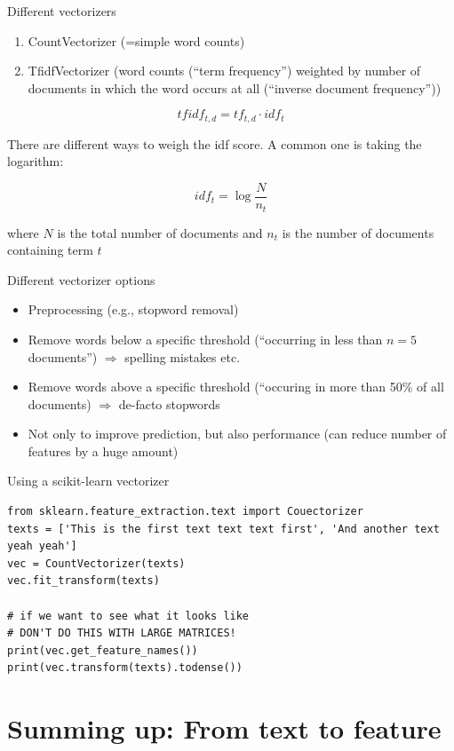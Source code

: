 \documentclass{beamer}
\begin{document}
\begin{frame}{Different vectorizers}
\begin{enumerate}[<+->]
	\item CountVectorizer (=simple word counts)
	\item TfidfVectorizer (word counts (``term frequency'') weighted by number of documents in which the word occurs at all (``inverse document frequency''))
\end{enumerate}

\pause
$$tfidf_{t,d} = tf_{t,d} \cdot idf_{t}$$

There are different ways to weigh the idf score. A common one is taking the logarithm:

$$idf_{t} = \log \frac{N}{n_t}$$

where $N$ is the total number of documents and $n_t$ is the number of documents containing term $t$
\end{frame}

\begin{frame}{Different vectorizer options}
\begin{itemize}
\item Preprocessing (e.g., stopword removal)
\item Remove words below a specific threshold (``occurring in less than $n=5$ documents'') $\Rightarrow$ spelling mistakes etc.
\item Remove words above a specific threshold (``occuring in more than 50\% of all documents) $\Rightarrow$ de-facto stopwords
\item Not only to improve prediction, but also performance (can reduce number of features by a huge amount)
\end{itemize}
\end{frame}


\begin{frame}[fragile]{Using a scikit-learn vectorizer}
\begin{lstlisting}
from sklearn.feature_extraction.text import Couectorizer
texts = ['This is the first text text text first', 'And another text yeah yeah']
vec = CountVectorizer(texts)
vec.fit_transform(texts) 

# if we want to see what it looks like
# DON'T DO THIS WITH LARGE MATRICES!
print(vec.get_feature_names())
print(vec.transform(texts).todense()) 
\end{lstlisting}
\end{frame}


\section{Summing up: From text to feature}
\end{document}
